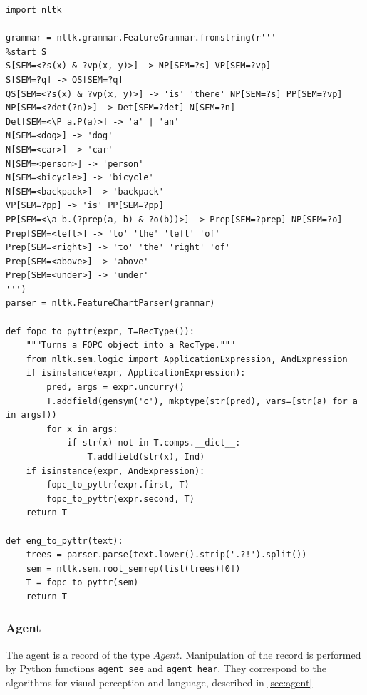 \begin{lstlisting}[label=lst:grammar, caption=Basic parsing of natural language into PyTTR object]
import nltk

grammar = nltk.grammar.FeatureGrammar.fromstring(r'''
%start S
S[SEM=<?s(x) & ?vp(x, y)>] -> NP[SEM=?s] VP[SEM=?vp]
S[SEM=?q] -> QS[SEM=?q]
QS[SEM=<?s(x) & ?vp(x, y)>] -> 'is' 'there' NP[SEM=?s] PP[SEM=?vp]
NP[SEM=<?det(?n)>] -> Det[SEM=?det] N[SEM=?n]
Det[SEM=<\P a.P(a)>] -> 'a' | 'an'
N[SEM=<dog>] -> 'dog'
N[SEM=<car>] -> 'car'
N[SEM=<person>] -> 'person'
N[SEM=<bicycle>] -> 'bicycle'
N[SEM=<backpack>] -> 'backpack'
VP[SEM=?pp] -> 'is' PP[SEM=?pp]
PP[SEM=<\a b.(?prep(a, b) & ?o(b))>] -> Prep[SEM=?prep] NP[SEM=?o]
Prep[SEM=<left>] -> 'to' 'the' 'left' 'of'
Prep[SEM=<right>] -> 'to' 'the' 'right' 'of'
Prep[SEM=<above>] -> 'above'
Prep[SEM=<under>] -> 'under'
''')
parser = nltk.FeatureChartParser(grammar)

def fopc_to_pyttr(expr, T=RecType()):
    """Turns a FOPC object into a RecType."""
    from nltk.sem.logic import ApplicationExpression, AndExpression
    if isinstance(expr, ApplicationExpression):
        pred, args = expr.uncurry()
        T.addfield(gensym('c'), mkptype(str(pred), vars=[str(a) for a in args]))
        for x in args:
            if str(x) not in T.comps.__dict__:
                T.addfield(str(x), Ind)
    if isinstance(expr, AndExpression):
        fopc_to_pyttr(expr.first, T)
        fopc_to_pyttr(expr.second, T)
    return T

def eng_to_pyttr(text):
    trees = parser.parse(text.lower().strip('.?!').split())
    sem = nltk.sem.root_semrep(list(trees)[0])
    T = fopc_to_pyttr(sem)
    return T
\end{lstlisting}



\subsubsection{Agent}
\label{sec:implagent}


The agent is a record of the type $Agent$.
Manipulation of the record is performed by Python functions \texttt{agent\_see} and \texttt{agent\_hear}.
They correspond to the algorithms for visual perception and language, described in \autoref{sec:agent}
